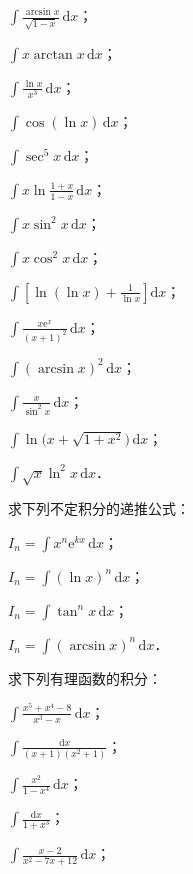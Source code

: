 \begin{xiti}
\begin{ziti}
\item $\displaystyle\int\frac{\arcsin x}{\sqrt{1-x}}\,\mathrm{d}x$；
\item $\displaystyle\int x\arctan x\,\mathrm{d}x$；
\item $\displaystyle\int\frac{\ln x}{x^{3}}\,\mathrm{d}x$；
\item $\displaystyle\int\cos(\ln x)\,\mathrm{d}x$；
\item $\displaystyle\int\sec^{5}x\,\mathrm{d}x$；
\item $\displaystyle\int x\ln\frac{1+x}{1-x}\,\mathrm{d}x$；
\item $\displaystyle\int x\sin^{2}x\,\mathrm{d}x$；
\item $\displaystyle\int x\cos^{2}x\,\mathrm{d}x$；
\item $\displaystyle\int\left[\ln(\ln x)+\frac{1}{\ln x}\right]\mathrm{d}x$；
\item $\displaystyle\int\frac{x\mathrm{e}^{x}}{(x+1)^{2}}\,\mathrm{d}x$；
\item $\displaystyle\int(\arcsin x)^{2}\,\mathrm{d}x$；
\item $\displaystyle\int\frac{x}{\sin^{2}x}\,\mathrm{d}x$；
\item $\displaystyle\int\ln\big(x+\sqrt{1+x^{2}}\big)\,\mathrm{d}x$；
\item $\displaystyle\int\sqrt{x}\ln^{2}x\,\mathrm{d}x$．
\end{ziti}
\item 求下列不定积分的递推公式：
\begin{ziti}
\item $I_{n} = \displaystyle\int x^{n}\mathrm{e}^{kx}\,\mathrm{d}x$；
\item $I_{n} = \displaystyle\int(\ln x)^{n}\,\mathrm{d}x$；
\item $I_{n} = \displaystyle\int\tan^{n}x\,\mathrm{d}x$；
\item $I_{n} = \displaystyle\int(\arcsin x)^{n}\,\mathrm{d}x$．
\end{ziti}
\item 求下列有理函数的积分：
\begin{ziti}
\item $\displaystyle\int\frac{x^{5}+x^{4}-8}{x^{3}-x}\,\mathrm{d}x$；
\item $\displaystyle\int\frac{\mathrm{d}x}{(x+1)(x^{2}+1)}$；
\item $\displaystyle\int\frac{x^{2}}{1-x^{4}}\,\mathrm{d}x$；
\item $\displaystyle\int\frac{\mathrm{d}x}{1+x^{3}}$；
\item $\displaystyle\int\frac{x-2}{x^{2}-7x+12}\,\mathrm{d}x$；

\end{ziti}
\end{xiti}
